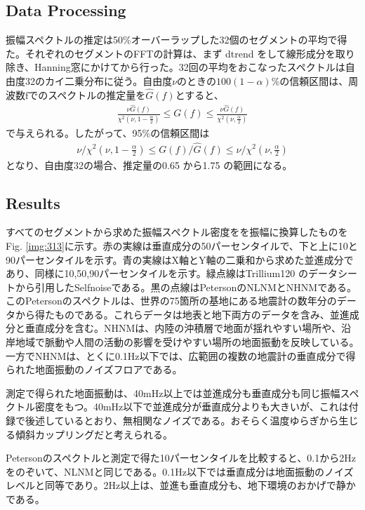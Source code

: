 \subsection{Data Processing}
振幅スペクトルの推定は50\%オーバーラップした32個のセグメントの平均で得た。それぞれのセグメントのFFTの計算は、まず dtrend をして線形成分を取り除き、Hanning窓にかけてから行った。32回の平均をおこなったスペクトルは自由度32のカイ二乗分布に従う。自由度$\nu$のときの$100(1-\alpha)$\%の信頼区間は、周波数$\mathrm{f}$でのスペクトルの推定量を$\hat{G}(f)$とすると、
\begin{eqnarray}
  \frac{\nu{\hat{G}(f)}}{\chi^2(\nu,1-\frac{\alpha}{2})} \leq G(f) \leq \frac{\nu{\hat{G}(f)}}{\chi^2(\nu,\frac{\alpha}{2})}
\end{eqnarray}
で与えられる。したがって、95\%の信頼区間は
\begin{eqnarray}
  \nu/\chi^2(\nu,1-\frac{\alpha}{2}) \leq G(f)/\hat{G}(f) \leq \nu/\chi^2(\nu,\frac{\alpha}{2})
\end{eqnarray}
となり、自由度32の場合、推定量の0.65 から1.75 の範囲になる。

\subsection{Results}
すべてのセグメントから求めた振幅スペクトル密度をを振幅に換算したものをFig. \ref{img:313}に示す。赤の実線は垂直成分の50パーセンタイルで、下と上に10と90パーセンタイルを示す。青の実線はX軸とY軸の二乗和から求めた並進成分であり、同様に10,50,90パーセンタイルを示す。緑点線はTrillium120 のデータシートから引用したSelfnoiseである。黒の点線はPetersonのNLNMとNHNMである。このPetersonのスペクトルは、世界の75箇所の基地にある地震計の数年分のデータから得たものである。これらデータは地表と地下両方のデータを含み、並進成分と垂直成分を含む。NHNMは、内陸の沖積層で地面が揺れやすい場所や、沿岸地域で脈動や人間の活動の影響を受けやすい場所の地面振動を反映している。一方でNHNMは、とくに0.1Hz以下では、広範囲の複数の地震計の垂直成分で得られた地面振動のノイズフロアである。

測定で得られた地面振動は、40mHz以上では並進成分も垂直成分も同じ振幅スペクトル密度をもつ。40mHz以下で並進成分が垂直成分よりも大きいが、これは付録で後述しているとおり、無相関なノイズである。おそらく温度ゆらぎから生じる傾斜カップリングだと考えられる。

Petersonのスペクトルと測定で得た10パーセンタイルを比較すると、0.1から2Hzをのぞいて、NLNMと同じである。0.1Hz以下では垂直成分は地面振動のノイズレベルと同等であり。2Hz以上は、並進も垂直成分も、地下環境のおかげで静かである。


